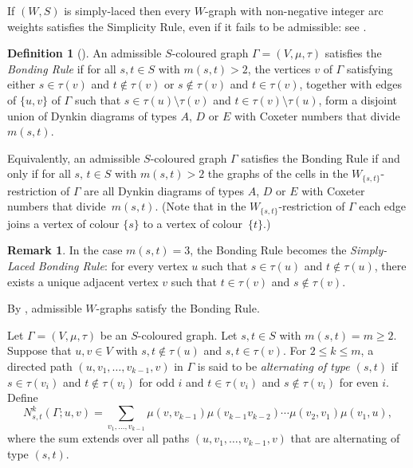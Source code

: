 \documentclass[10pt]{amsart}
\theoremstyle{definition}
\newtheorem{defi}[theo]{Definition}
\newtheorem{rema}[theo]{Remark}
\newcommand{\citex}[2]{\cite[#1]{#2}}
\begin{document}
If $(W,S)$ is simply-laced then every $W\!$-graph with non-negative
integer arc weights satisfies the Simplicity Rule, even if it fails to be
admissible: see \cite[Remark~4.3]{stem:addwgraph}.

\begin{defi}[{\citex{Definition~2.4}{stem:morewgraph}}]\label{bonding}
An admissible $S$-coloured graph $\Gamma = (V,\mu,\tau)$ satisfies the
\emph{Bonding Rule}
if for all $s,t\in S$ with $m(s,t)>2$,
the vertices $v$ of $\Gamma$ satisfying either $s\in\tau(v)$ and $t\notin\tau(v)$
or $s\notin\tau(v)$ and $t\in\tau(v)$,
together with edges of $\{u,v\}$ of $\Gamma$ such that
$s\in\tau(u)\setminus\tau(v)$ and $t\in\tau(v)\setminus\tau(u)$,
form a disjoint union of Dynkin diagrams of types $A$, $D$ or $E$
with Coxeter numbers that divide~$m(s,t)$.
\end{defi}

Equivalently, an admissible $S$-coloured graph $\Gamma$ satisfies the
Bonding Rule if and only if for all $s,\,t\in S$ with $m(s,t)>2$ the
graphs of the cells in the $W_{\{s,t\}}$-restriction of $\Gamma$ are all Dynkin
diagrams of types $A$, $D$ or $E$ with Coxeter numbers that divide~$m(s,t)$.
(Note that in the $W_{\{s,t\}}$-restriction of $\Gamma$ each edge joins
a vertex of colour $\{s\}$ to a vertex of colour~$\{t\}$.)

\begin{rema}\label{molecularbondingrule}
In the case $m(s,t)=3$, the
Bonding Rule
becomes the
\emph{Simply-Laced Bonding Rule}:
for every vertex $u$ such that
$s\in\tau(u)$ and $t\notin\tau(u)$, there exists a unique
adjacent vertex $v$ such that $t\in\tau(v)$ and $s\notin\tau(v)$.
\end{rema}
By \cite[Proposition~4.4]{stem:addwgraph}, admissible $W\!$-graphs satisfy the
Bonding Rule.

Let $\Gamma=(V,\mu,\tau)$ be an $S$-coloured graph. Let $s,t\in S$ with
$m(s,t) = m \geqslant 2$. Suppose that $u,v\in V$ with $s,t\notin \tau(u)$
and $s,t\in\tau(v)$. For $2\leqslant k\leqslant m$, a directed path
$(u,v_1,\ldots,v_{k-1},v)$ in $\Gamma$ is said to be \emph{alternating of type
$(s,t)$} if $s\in \tau(v_i)$ and $t\notin\tau(v_i)$ for odd $i$ and
$t\in\tau(v _i)$ and $s\notin\tau(v_i)$ for even $i$. Define
\begin{equation}\label{altsums}
N^k_{s,t}(\Gamma;u,v)=
\sum_{v_1,\ldots,v_{k-1}}\mu(v,v_{k-1})\mu(v_{k-1}v_{k-2})\cdots \mu(v_2,v_1)\mu(v_1,u),
\end{equation}
where the sum extends over all paths $(u,v_1,\ldots,v_{k-1},v)$ that are
alternating of type $(s,t)$.
\end{document}
